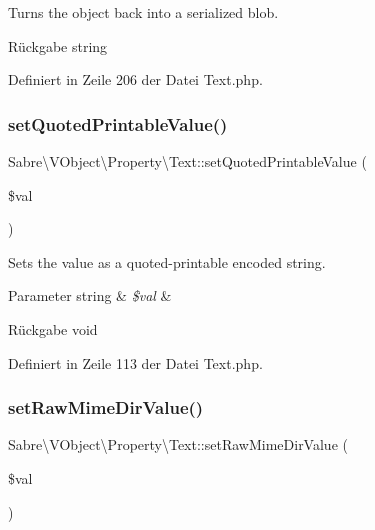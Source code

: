 Turns the object back into a serialized blob.

\begin{DoxyReturn}{Rückgabe}
string 
\end{DoxyReturn}


Definiert in Zeile 206 der Datei Text.\+php.

\mbox{\label{class_sabre_1_1_v_object_1_1_property_1_1_text_ac1d4147f1f6192958626484a9e7fd64d}} 
\subsubsection{\texorpdfstring{set\+Quoted\+Printable\+Value()}{setQuotedPrintableValue()}}
{\footnotesize\ttfamily Sabre\textbackslash{}\+V\+Object\textbackslash{}\+Property\textbackslash{}\+Text\+::set\+Quoted\+Printable\+Value (\begin{DoxyParamCaption}\item[{}]{\$val }\end{DoxyParamCaption})}

Sets the value as a quoted-\/printable encoded string.


\begin{DoxyParams}[1]{Parameter}
string & {\em \$val} & \\
\hline
\end{DoxyParams}
\begin{DoxyReturn}{Rückgabe}
void 
\end{DoxyReturn}


Definiert in Zeile 113 der Datei Text.\+php.

\mbox{\label{class_sabre_1_1_v_object_1_1_property_1_1_text_acb58aa35dc81be5453f3e56e59215418}} 
\subsubsection{\texorpdfstring{set\+Raw\+Mime\+Dir\+Value()}{setRawMimeDirValue()}}
{\footnotesize\ttfamily Sabre\textbackslash{}\+V\+Object\textbackslash{}\+Property\textbackslash{}\+Text\+::set\+Raw\+Mime\+Dir\+Value (\begin{DoxyParamCaption}\item[{}]{\$val }\end{DoxyParamCaption})}

